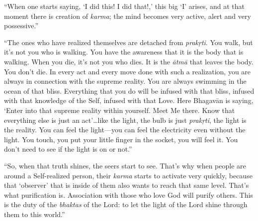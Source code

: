 \enquote{When one starts saying, \enquote{I did this! I did that!,} this big \enquote{I} arises, and at that moment there is creation of \textit{karma}; the mind becomes very active, alert and very possessive.}

\enquote{The ones who have realized themselves are detached from \textit{prakṛti}. You walk, but it’s not you who is walking. You have the awareness that it is the body that is walking. When you die, it’s not you who dies. It is the \textit{ātmā} that leaves the body. You don’t die. In every act and every move done with such a realization, you are always in connection with the supreme reality. You are always swimming in the ocean of that bliss. Everything that you do will be infused with that bliss, infused with that knowledge of the Self, infused with that Love. Here Bhagavān is saying, \enquote{Enter into that supreme reality within yourself. Meet Me there. Know that everything else is just an act}\ldots like the light, the bulb is just \textit{prakṛti}, the light is the reality. You can feel the light---you can feel the electricity even without the light. You touch, you put your little finger in the socket, you will feel it. You don’t need to see if the light is on or not.}

\enquote{So, when that truth shines, the seers start to see. That’s why when people are around a Self-realized person, their \textit{karma} starts to activate very quickly, because that \enquote{observer} that is inside of them also wants to reach that same level. That’s what purification is. Association with those who love God will purify others. This is the duty of the \textit{bhaktas} of the Lord: to let the light of the Lord shine through them to this world.}